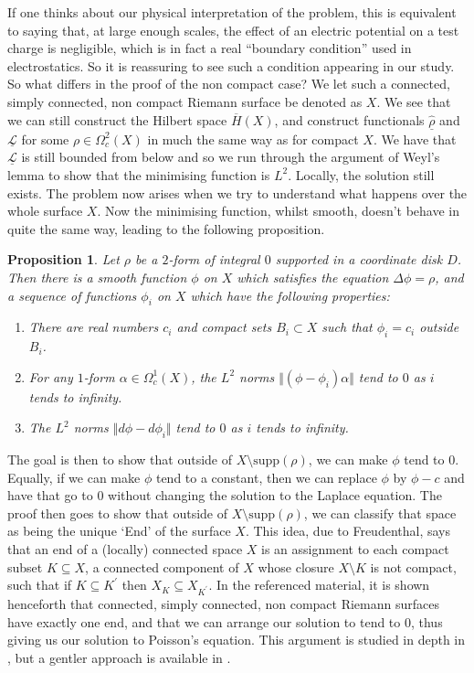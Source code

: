 \documentclass[11pt]{report}
\newtheorem{prop}[thm]{Proposition}
\theoremstyle{definition}
\begin{document}
If one thinks about our physical interpretation of the problem, this is equivalent to saying that, at large enough scales, the effect of an electric potential on a test charge is negligible, which is in fact a real ``boundary condition'' used in electrostatics. So it is reassuring to see such a condition appearing in our study. So what differs in the proof of the non compact case? We let such a connected, simply connected, non compact Riemann surface be denoted as $X$. We see that we can still construct the Hilbert space $\overline{H}(X)$, and construct functionals $\underline{\hat{\rho}}$ and $\underline{\mathcal{L}}$ for some $\rho \in \Omega^2_c(X)$ in much the same way as for compact $X$. We have that $\underline{\mathcal{L}}$ is still bounded from below and so we run through the argument of Weyl's lemma to show that the minimising function is $L^2$. Locally, the solution still exists. The problem now arises when we try to understand what happens over the whole surface $X$. Now the minimising function, whilst smooth, doesn't behave in quite the same way, leading to the following proposition.
\begin{prop}\cite[Proposition 32]{donaldson}
  Let $\rho$ be a $2$-form of integral $0$ supported in a coordinate disk $D$. Then there is a smooth function $\phi$ on $X$ which satisfies the equation $\Delta \phi = \rho$, and a sequence of functions $\phi_i$ on $X$ which have the following properties:
  \begin{enumerate}
    \item There are real numbers $c_i$ and compact sets $B_i\subset X$ such that $\phi_i = c_i$ outside $B_i$.
    \item For any $1$-form $\alpha \in \Omega^1_c(X)$, the $L^2$ norms $\Vert(\phi - \phi_i)\alpha\Vert$ tend to $0$ as $i$ tends to infinity.
    \item The $L^2$ norms $\Vert d\phi -d\phi_i\Vert$ tend to $0$ as $i$ tends to infinity.
  \end{enumerate}
\end{prop}
The goal is then to show that outside of $X\setminus\text{supp}(\rho)$, we can make $\phi$ tend to $0$. Equally, if we can make $\phi$ tend to a constant, then we can replace $\phi$ by $\phi - c$ and have that go to $0$ without changing the solution to the Laplace equation. The proof then goes to show that outside of $X\setminus\text{supp}(\rho)$, we can classify that space as being the unique `End' of the surface $X$. This idea, due to Freudenthal, says that an end of a (locally) connected space $X$ is an assignment to each compact subset $K \subseteq X$, a connected component of $X$ whose closure $X\setminus K$ is not compact, such that if $K\subseteq K^{\prime}$ then $X_K \subseteq X_{K^{\prime}}$. In the referenced material, it is shown henceforth that connected, simply connected, non compact Riemann surfaces have exactly one end, and that we can arrange our solution to tend to $0$, thus giving us our solution to Poisson's equation. This argument is studied in depth in \cite[Chapter 10]{donaldson}, but a gentler approach is available in \cite[p.32]{notes}.
\end{document}
